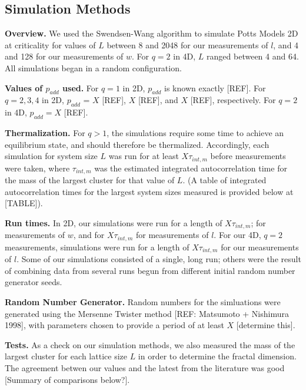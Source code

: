 \documentclass[pre,preprint,11pt]{revtex4}
\begin{document}
\subsection{Simulation Methods}

{\bf Overview.} We used the Swendsen-Wang algorithm to simulate Potts Models 2D at criticality for values of $L$ between 8 and 2048 for our  measurements of $l$, and 4 and 128 for our measurements of $w$.  For $q=2$ in 4D, $L$ ranged between 4 and 64.  All simulations began in a random configuration.  


{\bf Values of $p_{add}$ used.}  For $q=1$ in 2D, $p_{add}$ is known exactly [REF].  For $q=2,3,4$ in 2D, $p_{add}$ = $X$ [REF], $X$ [REF], and $X$ [REF], respectively. For $q=2$ in 4D, $p_{add}=X$ [REF].

{\bf Thermalization.} For $q>1$, the simulations require some time to achieve an equilibrium state, and should therefore be thermalized. Accordingly, each simulation for system size $L$ was run for at least $X \tau_{int,m}$ before measurements were taken, where $\tau_{int,m}$ was the estimated integrated autocorrelation time for the mass of the largest cluster for that value of $L$. (A table of integrated autocorrelation times for the largest system sizes measured is provided below at [TABLE]).  

{\bf Run times.} In 2D, our simulations were run for a length of $X \tau_{int,m}$; for measurements of $w$, and for $X  \tau_{int,m}$ for measurements of $l$.  For our 4D, $q=2$ measurements, simulations were run for a length of $X \tau_{int,m}$ for our measurements of $l$.  Some of our simulations consisted of a single, long run; others were the result of combining data from several runs begun from different initial random number generator seeds. 

{\bf Random Number Generator.} Random numbers for the simluations were generated using the Mersenne Twister method [REF:  Matsumoto + Nishimura 1998], with parameters chosen to provide a period of at least $X$ [determine this].

{\bf Tests.}  As a check on our simulation methods, we also measured the mass of the largest cluster for each lattice size $L$ in order to determine the fractal dimension.  The agreement betwen our values and the latest from the literature was good [Summary of comparisons below?].
\end{document}
